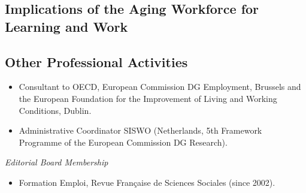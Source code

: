 

\subsection{Implications of the Aging Workforce for Learning and Work} 



\subsection{Other Professional Activities}

\begin{itemize}
\item Consultant to OECD, European Commission DG Employment, Brussels and the European Foundation for the Improvement of Living and Working Conditions, Dublin.
\item Administrative Coordinator SISWO (Netherlands, 5th Framework Programme of the European Commission DG Research). 
\end{itemize}

\textit{Editorial Board Membership}

\begin{itemize}
\item Formation Emploi, Revue Fran\c caise de Sciences Sociales (since 2002).
\end{itemize}

 

